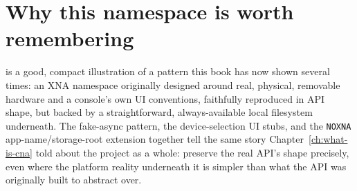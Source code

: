 \section{Why this namespace is worth remembering}

 is a good, compact illustration of a pattern this book has now shown several
times: an XNA namespace originally designed around real, physical, removable hardware and a
console's own UI conventions, faithfully reproduced in API shape, but backed by a
straightforward, always-available local filesystem underneath. The fake-async pattern, the
device-selection UI stubs, and the \texttt{NOXNA} app-name/storage-root extension together
tell the same story Chapter~\ref{ch:what-is-cna} told about the project as a whole: preserve the real API's
shape precisely, even where the platform reality underneath it is simpler than what the API
was originally built to abstract over.
